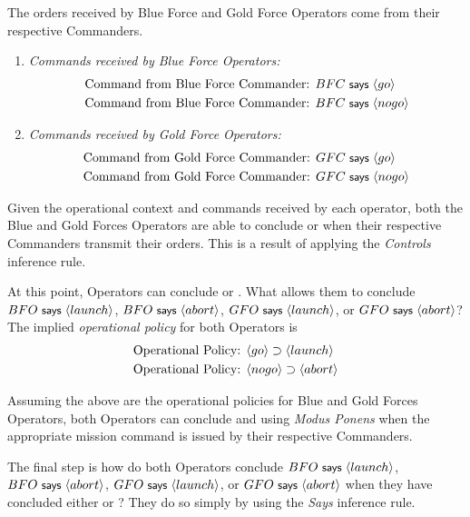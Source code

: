 The orders received by Blue Force and Gold Force Operators come from
their respective Commanders.
\begin{enumerate}[{}]
\item \emph{Commands received by Blue Force Operators:}
  \begin{align*}
    \text{Command from Blue Force Commander: } & BFC \text{\small\textsf{ says }} \langle go \rangle\\
    \text{Command from Blue Force Commander: } & BFC \text{\small\textsf{ says }} \langle nogo \rangle
  \end{align*}
\item \emph{Commands received by Gold Force Operators:}
  \begin{align*}
    \text{Command from Gold Force Commander: } & GFC \text{\small\textsf{ says }} \langle go \rangle\\
    \text{Command from Gold Force Commander: } & GFC \text{\small\textsf{ says }} \langle nogo \rangle
  \end{align*}
\end{enumerate}

Given the operational context and commands received by each operator,
both the Blue and Gold Forces Operators are able to conclude
 or  when their respective Commanders transmit
their orders. This is a result of applying the \emph{Controls}
inference rule.

At this point, Operators can conclude  or
. What allows them to conclude $BFO \text{\small\textsf{ says }}
\langle launch \rangle$, $BFO \text{\small\textsf{ says }} \langle abort \rangle$, $GFO \text{\small\textsf{ says }}
\langle launch \rangle$, or $GFO \text{\small\textsf{ says }} \langle abort \rangle$? The implied
\emph{operational policy} for both Operators is
\begin{align*}
  \text{Operational Policy: } & \langle go \rangle \supset \langle launch \rangle\\
  \text{Operational Policy: } & \langle nogo \rangle \supset \langle abort \rangle
\end{align*}

Assuming the above are the operational policies for Blue and Gold
Forces Operators, both Operators can conclude  and
 using \emph{Modus Ponens} when the appropriate mission
command is issued by their respective Commanders.  

The final step is how do both Operators conclude $BFO \text{\small\textsf{ says }}
\langle launch \rangle$, $BFO \text{\small\textsf{ says }} \langle abort \rangle$, $GFO \text{\small\textsf{ says }}
\langle launch \rangle$, or $GFO \text{\small\textsf{ says }} \langle abort \rangle$ when they have
concluded either  or ? They do so simply
by using the \emph{Says} inference rule.

